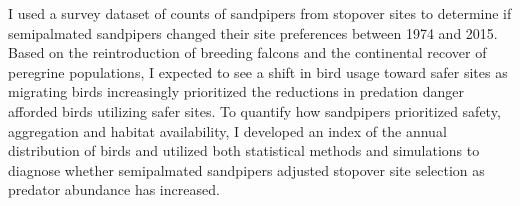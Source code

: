 I used a survey dataset of counts of sandpipers from stopover sites to determine if semipalmated sandpipers changed their site preferences between 1974 and 2015. Based on the reintroduction of breeding falcons and the continental recover of peregrine populations, I expected to see a shift in bird usage toward safer sites as migrating birds increasingly prioritized the reductions in predation danger afforded birds utilizing safer sites. To quantify how sandpipers prioritized safety, aggregation and habitat availability, I developed an index of the annual distribution of birds and utilized both statistical methods and simulations to diagnose whether semipalmated sandpipers adjusted stopover site selection as predator abundance has increased.